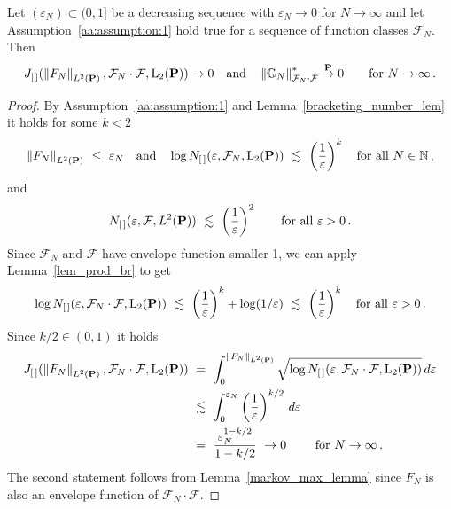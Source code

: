 \begin{lemma}
  \label{aa:r3:lemma:1}
  Let
$(\varepsilon_N)\subset(0,1]$
be 
a decreasing sequence
with $\varepsilon_N\to 0$ for $N\to\infty$ 
and let Assumption~\ref{aa:assumption:1} hold true
for a sequence of function classes $\mathcal{F}_N$.
Then
\begin{gather*}
  J_{[\,]}(
\norm{F_N}_{L^2(\P)}
,\mathcal{F}_N\cdot\mathcal{F},\mathrm{L}_2(\P))
  \to 0
  \quad
  \text{and}
  \quad
  \norm{\G_N}^*_{\mathcal{F}_N\cdot\mathcal{F}}\overset{\P}{\to}0
  \qquad
  \text{for}\ 
  N\to\infty
  \,.
\end{gather*}
\end{lemma}
\begin{proof}
  By Assumption~\ref{aa:assumption:1}
  and Lemma~\ref{bracketing_number_lem} it holds
for some $k<2$
\begin{gather*}
\norm{F_N}_{L^2(\P)}
\ 
\le
\ 
\varepsilon_N
\quad
\text{and}
\quad
  \log
  N_{[\,]}(\varepsilon,\mathcal{F}_N,\mathrm{L}_2(\P))
  \ 
  \lesssim
  \ 
  \left( 
  \frac{1}{\varepsilon}
  \right)^k
  \quad
  \text{for all}
  \ 
  N\in\mathbb{N}
  \,,
\end{gather*}
and
  \begin{gather*}
    N_{[\,]}
    (
    \varepsilon
    ,
    \mathcal{F}, L^2(\P))
    \ 
    \lesssim
    \ 
    \left( 
      \frac{1}{\varepsilon}
    \right)^2
    \qquad
    \text{for all}
    \ 
    \varepsilon>0
    \,.
  \end{gather*}
  Since $\mathcal{F}_N$ and $\mathcal{F}$ have envelope function smaller 1, we can apply Lemma~\ref{lem_prod_br} to get
  \begin{gather*}
  \log
  N_{[\,]}(\varepsilon,\mathcal{F}_N\cdot\mathcal{F},\mathrm{L}_2(\P))
  \ 
  \lesssim
  \ 
  \left( 
  \frac{1}{\varepsilon}
  \right)^k
  +
  \log
  (1/\varepsilon)
  \ 
  \lesssim
  \ 
  \left( 
  \frac{1}{\varepsilon}
  \right)^k
  \quad
  \text{for all}\ 
  \varepsilon>0
  \,.
  \end{gather*}
  Since 
  $k/2\in(0,1)$
  it holds
\begin{align*}
  J_{[\,]}(
\norm{F_N}_{L^2(\P)}
,\mathcal{F}_N\cdot\mathcal{F},\mathrm{L}_2(\P))
  &
  \ 
=
  \ 
\int_0^{
\norm{F_N}_{L^2(\P)}
}
\sqrt{
  \log
  N_{[\,]}(\varepsilon,\mathcal{F}_N\cdot\mathcal{F},\mathrm{L}_2(\P))
}
\,d\varepsilon
\\
&
\ 
\lesssim
\ 
\int_0^{
  \varepsilon_N
}
  \left( 
  \frac{1}{\varepsilon}
\right)^{k/2}
\,d\varepsilon
\\
&
\ 
=
\ 
\frac{
\varepsilon_N^{1-k/2}
}{1-k/2}
\ 
\to 0
\ 
\qquad
\text{for}
\ 
N\to\infty
\,.
\end{align*}
The second statement follows from Lemma~\ref{markov_max_lemma}
since $F_N$ is also an envelope function of $\mathcal{F}_N\cdot\mathcal{F}$.
\end{proof}

